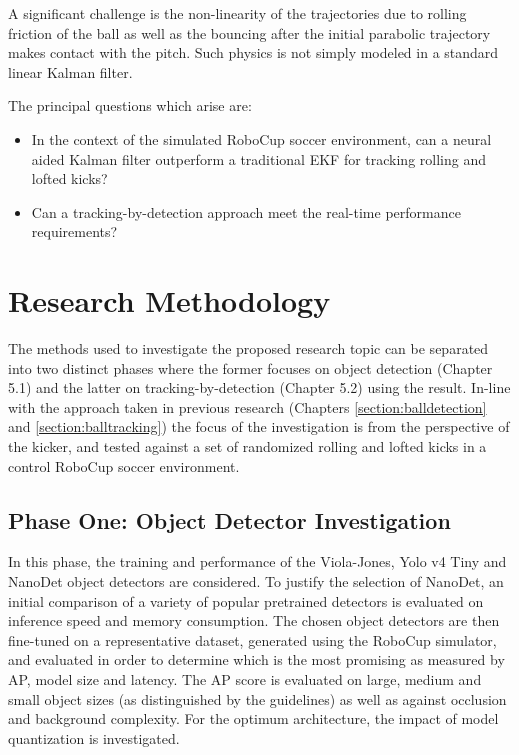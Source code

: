 \documentclass[a4paper,twoside,12pt]{report}
\begin{document}
A significant challenge is the non-linearity of the trajectories due to rolling friction of the ball as well as the bouncing after the initial parabolic trajectory makes contact with the pitch. Such physics is not simply modeled in a standard linear Kalman filter. 

The principal questions which arise are:
\begin{itemize}
    \item In the context of the simulated RoboCup soccer environment, can a neural aided Kalman filter outperform a traditional EKF for tracking rolling and lofted kicks?
	\item Can a tracking-by-detection approach meet the real-time performance requirements?
\end{itemize}

\chapter{Research Methodology}

The methods used to investigate the proposed research topic can be separated into two distinct phases where the former focuses on object detection (Chapter 5.1) and the latter on tracking-by-detection (Chapter 5.2) using the result. In-line with the approach taken in previous research (Chapters \ref{section:balldetection} and \ref{section:balltracking}) the focus of the investigation is from the perspective of the kicker, and tested against a set of randomized rolling and lofted kicks in a control RoboCup soccer environment. 

\section{Phase One: Object Detector Investigation}

In this phase, the training and performance of the Viola-Jones, Yolo v4 Tiny and NanoDet object detectors are considered. To justify the selection of NanoDet, an initial comparison of a variety of popular pretrained detectors is evaluated on inference speed and memory consumption. The chosen object detectors are then fine-tuned on a representative dataset, generated using the RoboCup simulator, and evaluated in order to determine which is the most promising as measured by AP, model size and latency. The AP score is evaluated on large, medium and small object sizes (as distinguished by the \cite{cocoeval} guidelines) as well as against occlusion and background complexity. For the optimum architecture, the impact of model quantization is investigated.
\end{document}
